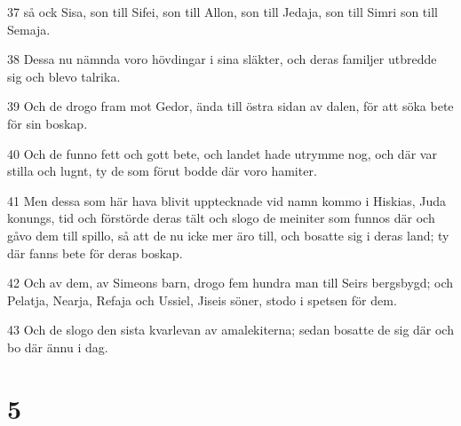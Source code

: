 \par 37 så ock Sisa, son till Sifei, son till Allon, son till Jedaja, son till Simri son till Semaja.
\par 38 Dessa nu nämnda voro hövdingar i sina släkter, och deras familjer utbredde sig och blevo talrika.
\par 39 Och de drogo fram mot Gedor, ända till östra sidan av dalen, för att söka bete för sin boskap.
\par 40 Och de funno fett och gott bete, och landet hade utrymme nog, och där var stilla och lugnt, ty de som förut bodde där voro hamiter.
\par 41 Men dessa som här hava blivit upptecknade vid namn kommo i Hiskias, Juda konungs, tid och förstörde deras tält och slogo de meiniter som funnos där och gåvo dem till spillo, så att de nu icke mer äro till, och bosatte sig i deras land; ty där fanns bete för deras boskap.
\par 42 Och av dem, av Simeons barn, drogo fem hundra man till Seirs bergsbygd; och Pelatja, Nearja, Refaja och Ussiel, Jiseis söner, stodo i spetsen för dem.
\par 43 Och de slogo den sista kvarlevan av amalekiterna; sedan bosatte de sig där och bo där ännu i dag.

\chapter{5}

